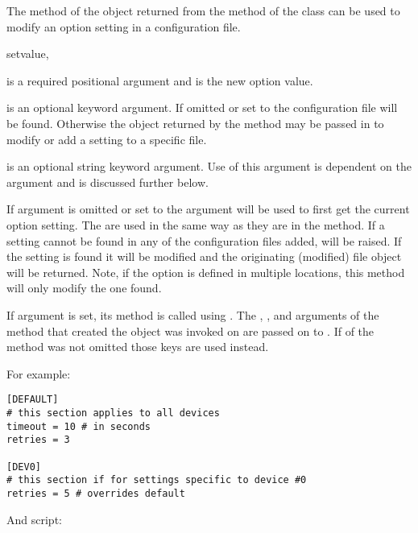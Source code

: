 \documentclass{howto}
\begin{document}
The  method of the object returned from the  method
of the  class can be used to modify an option setting in
a configuration file.

  \begin{funcdesc}{set}{value,}

     is a required positional argument and is the new option
        value.
        
     is an optional keyword argument.  If omitted or set to
         the configuration file will be found.  Otherwise
        the object returned by the  method may be passed
        in to modify or add a setting to a specific file.
        
     is an optional string keyword argument.  Use of this
        argument is dependent on the  argument and is
        discussed further below.
  
  \end{funcdesc}

If  argument is omitted or set to  the 
argument will be used to first get the current option setting.  The
 are used in the same way as they are in the  method.
If a setting cannot be found in any of the configuration files added,
 will be raised.  If the setting is found it will 
be modified and the originating (modified) file object will be returned.  
Note, if the option is defined in multiple locations, this method will
only modify the one found.

If  argument is set, its  method is called
using .  The , , and  arguments
of the  method that created the object  was 
invoked on are passed on to .  If  of the
 method was not omitted those keys are used instead.

For example:

\begin{verbatim}
[DEFAULT]
# this section applies to all devices
timeout = 10 # in seconds
retries = 3

[DEV0]
# this section if for settings specific to device #0
retries = 5 # overrides default
\end{verbatim}

And script:
\end{document}
